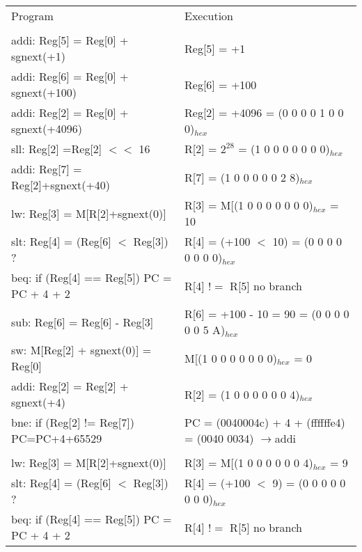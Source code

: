 \documentclass[11pt]{article}   	%
\begin{document}
\begin{table}[!htbp]
\begin{tabular}{ll}
Program & Execution\\
&\\

addi: Reg[5] = Reg[0] + sgnext(+1)  &  Reg[5] = +1\\

addi: Reg[6] = Reg[0] + sgnext(+100) &  Reg[6] = +100\\

addi: Reg[2] = Reg[0] + sgnext(+4096)&  Reg[2] = +4096 = (0 0 0 0 1 0 0 0)$_{hex}$\\

sll: Reg[2] =Reg[2] $<<$ 16& R[2] = $2^{28}$ = (1 0 0 0 0 0 0 0)$_{hex}$\\

addi: Reg[7] = Reg[2]+sgnext(+40)& R[7] = (1 0 0 0 0 0 2 8)$_{hex}$\\

lw: Reg[3] = M[R[2]+sgnext(0)]&  R[3] = M[(1 0 0 0 0 0 0 0)$_{hex}$ = 10 \\

slt: Reg[4] = (Reg[6] $<$ Reg[3]) ?& R[4] = (+100 $<$ 10) = (0 0 0 0 0 0 0 0)$_{hex}$\\

beq: if (Reg[4] == Reg[5]) PC = PC + 4 + 2& R[4] $!=$ R[5]  no branch\\

sub: Reg[6] = Reg[6] - Reg[3]& R[6] = +100 - 10 = 90 = (0 0 0 0 0 0 5 A)$_{hex}$\\

sw: M[Reg[2] + sgnext(0)] = Reg[0]& M[(1 0 0 0 0 0 0 0)$_{hex}$ = 0\\

addi: Reg[2] = Reg[2] + sgnext(+4) & R[2] = (1 0 0 0 0 0 0 4)$_{hex}$\\

bne: if (Reg[2] != Reg[7]) PC=PC+4+65529 & PC = (0040004c) + 4 + (ffffffe4) = (0040 0034)  $\rightarrow$addi\\

&\\

lw: Reg[3] = M[R[2]+sgnext(0)]&  R[3] = M[(1 0 0 0 0 0 0 4)$_{hex}$ = 9 \\

slt: Reg[4] = (Reg[6] $<$ Reg[3]) ?& R[4] = (+100 $<$ 9) = (0 0 0 0 0 0 0 0)$_{hex}$\\

beq: if (Reg[4] == Reg[5]) PC = PC + 4 + 2& R[4] $!=$ R[5]  no branch\\


\end{tabular}
\end{table}
\end{document}
